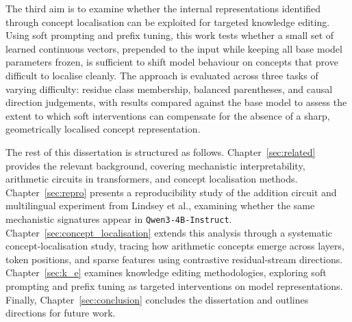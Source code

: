 The third aim is to examine whether the internal representations identified through concept localisation can be exploited for targeted knowledge editing. Using soft prompting and prefix tuning, this work tests whether a small set of learned continuous vectors, prepended to the input while keeping all base model parameters frozen, is sufficient to shift model behaviour on concepts that prove difficult to localise cleanly. The approach is evaluated across three tasks of varying difficulty: residue class membership, balanced parentheses, and causal direction judgements, with results compared against the base model to assess the extent to which soft interventions can compensate for the absence of a sharp, geometrically localised concept representation.

The rest of this dissertation is structured as follows. Chapter~\ref{sec:related} provides the relevant background, covering mechanistic interpretability, arithmetic circuits in transformers, and concept localisation methods. Chapter~\ref{sec:repro} presents a reproducibility study of the addition circuit and multilingual experiment from Lindsey et al., examining whether the same mechanistic signatures appear in \texttt{Qwen3-4B-Instruct}. Chapter~\ref{sec:concept_localisation} extends this analysis through a systematic concept-localisation study, tracing how arithmetic concepts emerge across layers, token positions, and sparse features using contrastive residual-stream directions. Chapter~\ref{sec:k_e} examines knowledge editing methodologies, exploring soft prompting and prefix tuning as targeted interventions on model representations. Finally, Chapter~\ref{sec:conclusion} concludes the dissertation and outlines directions for future work.